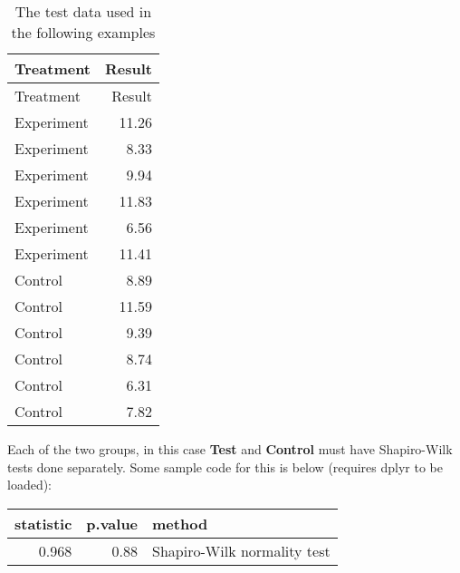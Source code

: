 \documentclass[]{article}
\newenvironment{Shaded}{\begin{snugshade}}{\end{snugshade}}
\newcommand{\KeywordTok}[1]{\textcolor[rgb]{0.13,0.29,0.53}{\textbf{{#1}}}}
\newcommand{\StringTok}[1]{\textcolor[rgb]{0.31,0.60,0.02}{{#1}}}
\newcommand{\CommentTok}[1]{\textcolor[rgb]{0.56,0.35,0.01}{\textit{{#1}}}}
\newcommand{\NormalTok}[1]{{#1}}
\begin{document}
\begin{longtable}[]{@{}lr@{}}
\caption{The test data used in the following examples}\tabularnewline
\toprule
Treatment & Result\tabularnewline
\midrule
\endfirsthead
\toprule
Treatment & Result\tabularnewline
\midrule
\endhead
Experiment & 11.26\tabularnewline
Experiment & 8.33\tabularnewline
Experiment & 9.94\tabularnewline
Experiment & 11.83\tabularnewline
Experiment & 6.56\tabularnewline
Experiment & 11.41\tabularnewline
Control & 8.89\tabularnewline
Control & 11.59\tabularnewline
Control & 9.39\tabularnewline
Control & 8.74\tabularnewline
Control & 6.31\tabularnewline
Control & 7.82\tabularnewline
\bottomrule
\end{longtable}

Each of the two groups, in this case \textbf{Test} and \textbf{Control}
must have Shapiro-Wilk tests done separately. Some sample code for this
is below (requires dplyr to be loaded):

\begin{Shaded}
\end{Shaded}

\begin{longtable}[]{@{}rrl@{}}
\toprule
statistic & p.value & method\tabularnewline
\midrule
\endhead
0.968 & 0.88 & Shapiro-Wilk normality test\tabularnewline
\bottomrule
\end{longtable}

\begin{Shaded}
\end{Shaded}
\end{document}
